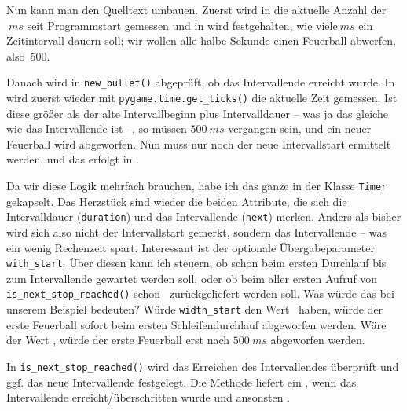Nun kann man den Quelltext umbauen. Zuerst wird in  die aktuelle Anzahl der $~ms$ seit Programmstart gemessen und in  wird festgehalten, wie viele$~ms$ ein Zeitintervall dauern soll; wir wollen alle halbe Sekunde einen Feuerball abwerfen, also~500.


Danach wird in \texttt{new\_bullet()} abgeprüft, ob das Intervallende erreicht wurde. In  wird zuerst wieder mit \texttt{pygame.time.get\_ticks()} die aktuelle Zeit gemessen. Ist diese größer als der alte Intervallbeginn plus Intervalldauer -- was ja das gleiche wie das Intervallende ist --, so müssen $500~ms$ vergangen sein, und ein neuer Feuerball wird abgeworfen. Nun muss nur noch der neue Intervallstart ermittelt werden, und das erfolgt in .


Da wir diese Logik mehrfach brauchen, habe ich das ganze in der Klasse \texttt{Timer} gekapselt. Das Herzstück sind wieder die beiden Attribute, die sich die Intervalldauer (\texttt{duration}) und das Intervallende (\texttt{next})  merken. Anders als bisher wird sich also nicht der Intervallstart gemerkt, sondern das Intervallende -- was ein wenig Rechenzeit spart. Interessant ist der optionale Übergabeparameter \texttt{with\_start}. Über diesen kann ich steuern, ob schon beim ersten Durchlauf bis zum Intervallende gewartet werden soll, oder ob beim aller ersten Aufruf von \texttt{is\_next\_stop\_reached()} schon \true\ zurückgeliefert werden soll. Was würde das bei unserem Beispiel bedeuten? Würde \texttt{width\_start} den Wert \true\ haben, würde der erste Feuerball sofort beim ersten Schleifendurchlauf abgeworfen werden. Wäre der Wert \false, würde der erste Feuerball erst nach $500~ms$ abgeworfen werden.

In \texttt{is\_next\_stop\_reached()} wird das Erreichen des Intervallendes überprüft und ggf. das neue Intervallende festgelegt. Die Methode liefert ein \true, wenn das Intervallende erreicht/überschritten wurde und ansonsten \false.


